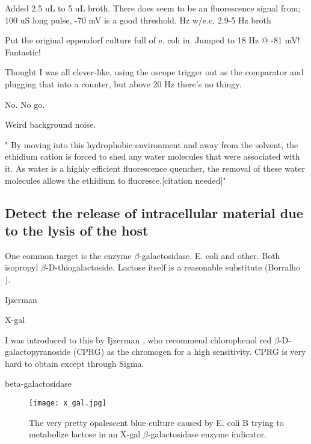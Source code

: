 \documentclass[paper.tex]{subfiles}
\begin{document}
Added 2.5 uL to 5 uL broth. There does seem to be an fluorescence signal from; 100 uS long pulse, -70 mV is a good threshold.
Hz w/e.c, 2.9-5 Hz broth

Put the original eppendorf culture full of e. coli in. Jumped to 18 Hz @ -81 mV! Fantastic!

Thought I was all clever-like, using the oscope trigger out as the comparator and plugging that into a counter,
but above 20 Hz there's no thingy.

No. No go.

Weird background noise.

" By moving into this hydrophobic environment and away from the solvent, the ethidium cation is forced to shed any water molecules that were associated with it. As water is a highly efficient fluorescence quencher, the removal of these water molecules allows the ethidium to fluoresce.[citation needed]"







\subsection{Detect the release of intracellular material due to the lysis of the host}

One common target is the enzyme $\beta$-galactosidase. E. coli and other. Both  isopropyl $\beta$-D-thiogalactoside. Lactose itself is a reasonable substitute (Borralho \cite{Lactose2002}).

Ijzerman

X-gal \cite{Improved}

I was introduced to this by Ijzerman \cite{liquid1993}, who recommend chlorophenol red $\beta$-D-galactopyranoside (CPRG) as the chromogen for a high sensitivity. CPRG is very hard to obtain except through Sigma.



beta-galactosidase



\begin{figure}[H]
	\captionsetup{singlelinecheck = false, justification=justified}
	\centering
	\texttt{[image: x\_gal.jpg]}
	\caption{The very pretty opalescent blue culture caused by E. coli B trying to metabolize lactose in an X-gal $\beta$-galactosidase enzyme indicator.}
\end{figure}
\end{document}
